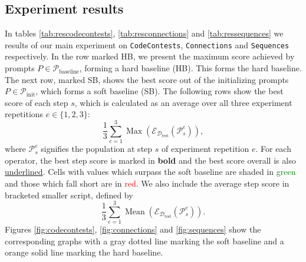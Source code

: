 \subsection{Experiment results}
In tables \ref{tab:rescodecontests}, \ref{tab:resconnections} and \ref{tab:ressequences} we results of our 
main experiment on \texttt{CodeContests}, \texttt{Connections} and \texttt{Sequences} respectively.
In the row marked HB, we present the maximum score achieved by prompts $P\in\mathcal{P}_{\text{baseline}}$, forming a hard baseline (HB). 
This forms the hard baseline. The next row, marked SB, shows the best score out of the initializing prompts $P\in\mathcal{P}_{\text{init}}$, which forms a soft baseline (SB).
The following rows show the best score of each step $s$, which is calculated as an average over all three experiment repetitions $e\in\{1,2,3\}$:
\begin{equation}
    \frac{1}{3}\sum_{e=1}^{3}\operatorname{Max}(\mathcal{E}_{\mathcal{D}_{\text{test}}}(\mathcal{P}_{s}^{e})),
\end{equation}
where $\mathcal{P}_{s}^{e}$ signifies the population at step $s$ of experiment repetition $e$.
For each operator, the best step score is marked in \textbf{bold} and the best score overall is also \underline{underlined}.
Cells with values which surpass the soft baseline are shaded in \textcolor{green}{green} and those which fall short are in \textcolor{red}{red}.
We also include the average step score in bracketed smaller script, defined by 
\begin{equation}
    \frac{1}{3}\sum_{e=1}^{3}\operatorname{Mean}(\mathcal{E}_{\mathcal{D}_{\text{test}}}(\mathcal{P}_{s}^{e})).
\end{equation}
Figures \ref{fig:codecontests}, \ref{fig:connections} and \ref{fig:sequences} show the corresponding graphs with a gray dotted line marking 
the soft baseline and a orange solid line marking the hard baseline.

